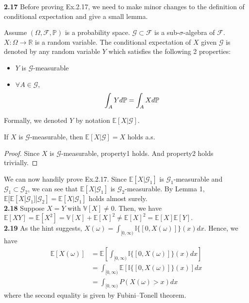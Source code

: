 \noindent\textbf{2.17}
Before proving Ex.2.17, we need to make minor changes to the definition of conditional expectation and give a small lemma.
\begin{definition}
    Assume $(\Omega,\mathcal{F},\mathbb{P})$
is a probability space. $\mathcal{G}\subset \mathcal{F}$ is a sub-$\sigma$-algebra of $\mathcal{F}$. $X:\Omega\rightarrow \mathbb{R}$ is a random variable. The
conditional expectation of $X$ given $\mathcal{G}$ is denoted by any random variable $Y$ which satisfies the following 2 properties:
\begin{itemize}
    \item $Y$ is $\mathcal{G}$-measurable
    \item $\forall A\in \mathcal{G}$,
        \begin{equation}
            \int_A Yd\mathbb{P}=\int_AXd\mathbb{P}\notag
        \end{equation}
\end{itemize}
Formally, we denoted $Y$ by notation $\mathbb{E}[X|\mathcal{G}]$.
\end{definition}

\begin{lemma}
    If $X$ is $\mathcal{G}$-measurable, then $\mathbb{E}[X|\mathcal{G}]=X$ holds a.s.
\end{lemma}
\begin{proof}
    Since $X$ is $\mathcal{G}$-measurable, property1 holds. And property2 holds trivially.
\end{proof}
\noindent We can now handily prove Ex.2.17. Since $\mathbb{E}[X|\mathcal{G}_1]$ is $\mathcal{G}_1$-measurable and $\mathcal{G}_1\subset \mathcal{G}_2$, we can see that
$\mathbb{E}[X|\mathcal{G}_1]$ is $\mathcal{G}_2$-measurable. By Lemma 1, $\mathbb{E}[\mathbb{E}[X|\mathcal{G}_1]|\mathcal{G}_2]=\mathbb{E}[X|\mathcal{G}_1]$ holds almost
surely.\\

\noindent\textbf{2.18} Suppose $X = Y$ with $\mathbb{V}[X] \neq 0$.
Then, we have $\mathbb{E}[X Y] = \mathbb{E}[X^2] = \mathbb{V}[X] + \mathbb{E}[X]^2 \neq \mathbb{E}[X]^2 = \mathbb{E}[X]\mathbb{E}[Y]$.\\


\noindent\textbf{2.19} As the hint suggests, $X(\omega)=\int_{[0, \infty)} \mathbb{I}\{[0, X(\omega)]\}(x) dx$.
Hence, we have
\begin{equation}
    \begin{split}
        \mathbb{E}[X(\omega)]
        &= \mathbb{E}[\int_{[0, \infty)} \mathbb{I}\{[0, X(\omega)]\}(x) dx]\\
        &= \int_{[0, \infty)} \mathbb{E}[\mathbb{I}\{[0, X(\omega)]\}(x)] dx\\
        &= \int_{[0, \infty)} P(X(\omega) > x) dx
    \end{split}
\end{equation}
where the second equality is given by Fubini–Tonell theorem.\\


